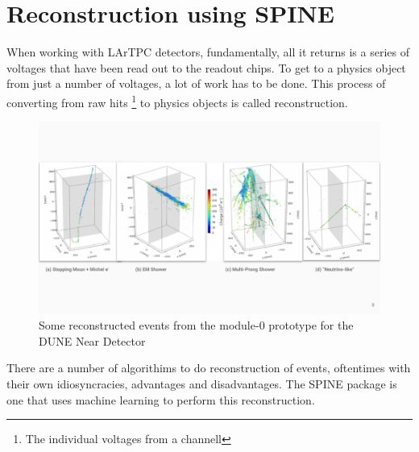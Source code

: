 \section{Reconstruction using SPINE}

When working with LArTPC detectors, fundamentally, all it returns is a series of voltages that have been read out to the  readout chips.
To get to a physics object from just a number of  voltages, a lot of work has to be done.
This process of converting from raw hits
\footnote{The individual voltages from a channell}
to physics objects is called reconstruction.

\begin{figure}[H]
  \centering
  \includegraphics[width=120mm]{figures/mod0Events.png}
  \caption{Some reconstructed events from the module-0 prototype for the DUNE Near Detector}
  \label{mod0Event}
\end{figure}

There are a number of algorithims to do reconstruction of events, oftentimes with their own idiosyncracies, advantages and disadvantages.
The SPINE package is one that uses machine learning to perform this reconstruction.

